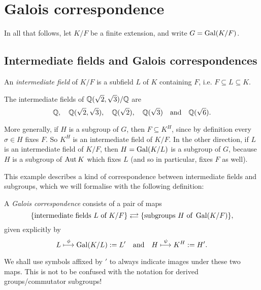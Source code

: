 \chapter{Galois correspondence}

In all that follows, let $K/F$ be a finite extension, and write $G = \operatorname{Gal}(K/F)$.

\section{Intermediate fields and Galois correspondences}

\begin{definition}
    An \emph{intermediate field} of $K/F$ is a subfield $L$ of $K$ containing $F$, i.e. $F \subseteq L \subseteq K$.
\end{definition}

\begin{example}
    The intermediate fields of $\mathbb{{Q}}(\sqrt{2}, \sqrt{3})/\mathbb{{Q}}$ are
    \[
        \mathbb{{Q}}, \quad \mathbb{{Q}}(\sqrt{2}, \sqrt{3}), \quad \mathbb{{Q}}(\sqrt{2}), \quad \mathbb{{Q}}(\sqrt{3}) \quad \text{and} \quad \mathbb{{Q}}(\sqrt{6}).
    \]
\end{example}

\begin{example}
    More generally, if $H$ is a subgroup of $G$, then $F \subseteq K^H$, since by definition every $\sigma \in H$ fixes $F$. So $K^H$ is an intermediate field of $K/F$. In the other direction, if $L$ is an intermediate field of $K/F$, then $H = \operatorname{Gal}(K/L)$ is a subgroup of $G$, because $H$ is a subgroup of $\operatorname{Aut}{K}$ which fixes $L$ (and so in particular, fixes $F$ as well).
\end{example}

This example describes a kind of correspondence between intermediate fields and subgroups, which we will formalise with the following definition:

\begin{definition}
    A \emph{Galois correspondence} consists of a pair of maps
    \[
        \{\text{intermediate fields } L \text{ of } K/F\}
        \correspondence
        \{\text{subgroups } H \text{ of } \gal(K/F)\},
    \]
    given explicitly by
    \[
        L \stackrel{\phi}{\longmapsto} \operatorname{Gal}(K/L) := L' \quad \text{and} \quad H \stackrel{\psi}{\longmapsto} K^H := H'.
    \]
\end{definition}

\begin{remark}
    We shall use symbols affixed by $'$ to always indicate images under these two maps. This is not to be confused with the notation for derived groups/commutator subgroups!
\end{remark}

